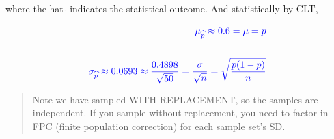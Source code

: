 \documentclass[float=false,crop=false]{standalone}
\begin{document}
where the hat \(\widehat{}\) indicates the statistical outcome. And
statistically by CLT,

\begin{equation}
\color {blue} {
\begin{aligned}
\mu_{\widehat{p}} \approx 0.6 = \mu = p \\ \\
\sigma_{\widehat{p}} \approx 0.0693 \approx \dfrac{0.4898}{\sqrt{50}} = \dfrac {\sigma}{\sqrt{n}} = \sqrt{\dfrac {p(1-p)}{n}}
\end{aligned}
}
\end{equation}

\begin{quote}
Note we have sampled WITH REPLACEMENT, so the samples are independent.
If you sample without replacement, you need to factor in FPC (finite
population correction) for each sample set's SD.
\end{quote}
\end{document}
